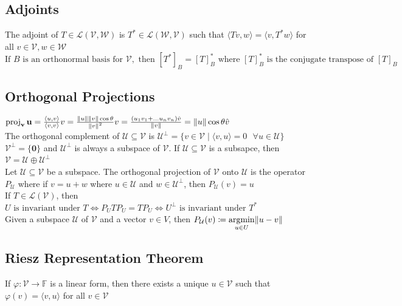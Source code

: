 \documentclass{article}
\DeclarePairedDelimiter\norm{\lVert}{\rVert}%
\DeclareMathOperator{\PProjection}{proj}
\DeclareMathOperator*{\argmin}{argmin}
\newcommand{\F}{\mathbb{F}}
\newcommand{\linear}{\mathcal{L}}
\newcommand{\U}{\mathcal{U}}
\newcommand{\V}{\mathcal{V}}
\newcommand{\W}{\mathcal{W}}
\newcommand\inner[2]{\langle #1, #2 \rangle}
\newcommand{\vct}{\mathbf}
\newcommand{\PProj}[2][]{\PProjection_{\vct{#1}}\vct{#2}}
\begin{document}
\subsection{Adjoints}
The adjoint of $T \in \linear(\V, \W)$ is $T^* \in \linear(\W, \V)$ such that $\inner{Tv}{w} = \inner{v}{T^*w}$ for all $v \in \V, w \in \W$ \\
$\mbox{If } B \mbox { is an orthonormal basis for }\V, \mbox{ then }[T^*]_B = [T]_B^* \mbox{ where } [T]_B^* \mbox{ is the conjugate transpose of } [T]_B$

\subsection{Orthogonal Projections}
$\PProj[v] {u} = \frac{\inner{u}{v}}{\inner{v}{v}} v = \frac{\norm u \norm v \cos \theta}{{\norm v}^2}v = \frac{(u_1v_1 + \ldots u_nv_n)\hat{v}}{\norm v}  = \norm u \cos \theta \hat{v}$ \\
The orthogonal complement of $\U \subseteq \V$ is $\U^{\perp} = \{v \in \V \mid \inner{v}{u} = 0 \mbox{ }\forall u \in \U \}$ \\
$\V^{\perp} = \{\boldsymbol{0}\}$ and $\U^{\perp}$ is always a subspace of $\V$. If $\U \subseteq \V$ is a subsapce, then $\V = \U \oplus \U^{\perp}$ \\
Let $\U \subseteq \V$ be a subspace. The orthogonal projection of $\V$ onto $\U$ is the operator $P_{\U}$ where if $v = u + w$ where $u \in \U$ and $w \in \U^{\perp}$, then $P_{\U}(v) = u$ \\
If $T \in \linear(\V)$, then $U\mbox{ is invariant under }T \iff P_UTP_U = TP_U \iff U^\perp \mbox{ is invariant under }T^*$ \\
Given a subspace $\U$ of $\V$ and a vector $v \in V$, then $P_{\U}(v) \coloneqq \argmin\limits_{u \in U} \norm{u - v}$ 


\subsection{Riesz Representation Theorem}
If $\varphi: \V \rightarrow \F$ is a linear form, then there exists a unique $u \in \V$ such that $\varphi(v) = \inner v u$ for all $v \in \V$
\end{document}
